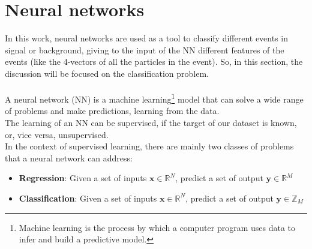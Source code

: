 \label{sec:STAT}
\minitoc
\section{Neural networks}
In this work, neural networks are used as a tool to classify different events in signal or background, giving to the input of the NN different features of the events (like the 4-vectors of all the particles in the event). So, in this section, the discussion will be focused on the classification problem.\\
\\
A neural network (NN) is a machine learning\footnote{Machine learning is the process by which a computer program uses data to infer and build a predictive model.} model that can solve a wide range of problems and make predictions, learning from the data.\\
The learning of an NN can be supervised, if the target of our dataset is known, or, vice versa, unsupervised.\\
In the context of supervised learning, there are mainly two classes of problems that a neural network can address:
\begin{itemize}
    \item \textbf{Regression}: Given a set of inputs $\bm{x} \in \mathbb{R}^N$, predict a set of output $\bm{y} \in \mathbb{R}^M$
    \item \textbf{Classification}: Given a set of inputs $\bm{x} \in \mathbb{R}^N$, predict a set of output $\bm{y} \in \mathbb{Z}_M$
\end{itemize}


